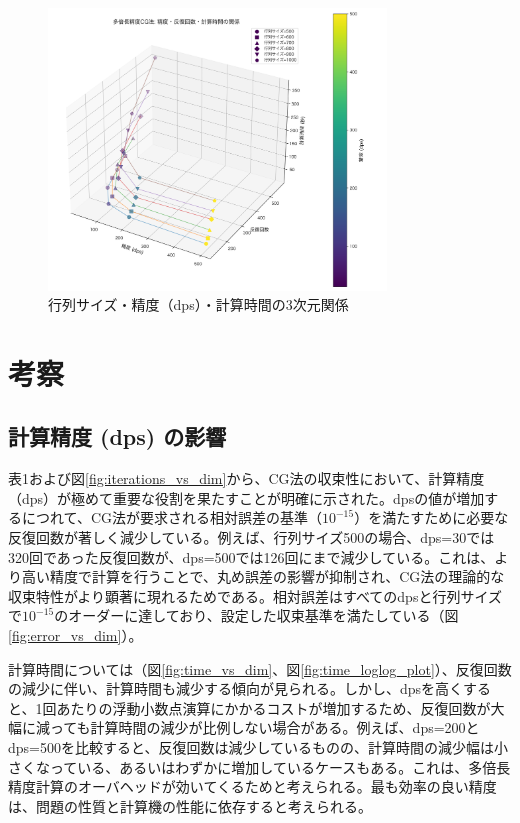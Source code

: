 \documentclass{article}
\begin{document}
\begin{figure}[H]
    \centering
    \includegraphics[width=0.8\textwidth]{mpmath_3d_plot.png}
    \caption{行列サイズ・精度（dps）・計算時間の3次元関係}
    \label{fig:3d_plot}
\end{figure}
\section{考察}

\subsection{計算精度 (dps) の影響}
表1および図\ref{fig:iterations_vs_dim}から、CG法の収束性において、計算精度（dps）が極めて重要な役割を果たすことが明確に示された。dpsの値が増加するにつれて、CG法が要求される相対誤差の基準（$10^{-15}$）を満たすために必要な反復回数が著しく減少している。例えば、行列サイズ500の場合、dps=30では320回であった反復回数が、dps=500では126回にまで減少している。これは、より高い精度で計算を行うことで、丸め誤差の影響が抑制され、CG法の理論的な収束特性がより顕著に現れるためである。相対誤差はすべてのdpsと行列サイズで$10^{-15}$のオーダーに達しており、設定した収束基準を満たしている（図\ref{fig:error_vs_dim}）。

計算時間については（図\ref{fig:time_vs_dim}、図\ref{fig:time_loglog_plot}）、反復回数の減少に伴い、計算時間も減少する傾向が見られる。しかし、dpsを高くすると、1回あたりの浮動小数点演算にかかるコストが増加するため、反復回数が大幅に減っても計算時間の減少が比例しない場合がある。例えば、dps=200とdps=500を比較すると、反復回数は減少しているものの、計算時間の減少幅は小さくなっている、あるいはわずかに増加しているケースもある。これは、多倍長精度計算のオーバヘッドが効いてくるためと考えられる。最も効率の良い精度は、問題の性質と計算機の性能に依存すると考えられる。
\end{document}
